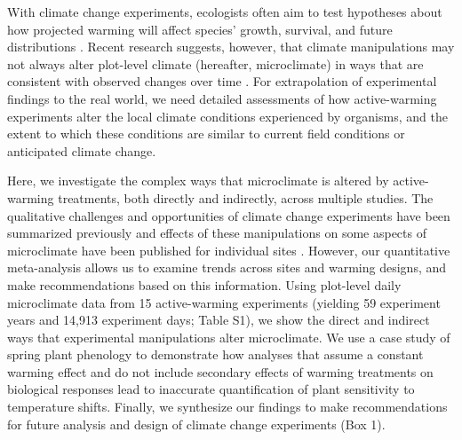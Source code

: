 \documentclass{article}
\begin{document}
\par With climate change experiments, ecologists often aim to test hypotheses about how projected warming will affect species' growth, survival, and future distributions \citep{dukes1999,hobbie1999,morin2010,pelini2011,chuine2012,reich2015,gruner2017}. %
Recent research suggests, however, that climate manipulations may not always alter plot-level climate (hereafter, microclimate) in ways that are consistent with observed changes over time \citep{wolkovich2012,menke2014,andresen2016}. For extrapolation of experimental findings to the real world, we need detailed assessments of how active-warming experiments alter the local climate conditions experienced by organisms, and the extent to which these conditions are similar to current field conditions or anticipated climate change. 
\par Here, we investigate the complex ways that microclimate is altered by active-warming treatments, both directly and indirectly, across multiple studies. The qualitative challenges and opportunities of climate change experiments have been summarized previously \citep[e.g.,][]{deboeck2015} and effects of these manipulations on some aspects of microclimate have been published for individual sites \citep[e.g.,][]{harte1995b,mcdaniel2014,pelini2011}. However, our quantitative meta-analysis allows us to examine trends across sites and warming designs, and make recommendations based on this information. Using plot-level daily microclimate data from 15 active-warming experiments (yielding 59 experiment years and 14,913 experiment days; Table S1), we show the direct and indirect ways that experimental manipulations alter microclimate. We use a case study of spring plant phenology to demonstrate how analyses that assume a constant warming effect and do not include secondary effects of warming treatments on biological responses lead to inaccurate quantification of plant sensitivity to temperature shifts. Finally, we synthesize our findings to make recommendations for future analysis and design of climate change experiments (Box 1). 
\end{document}
